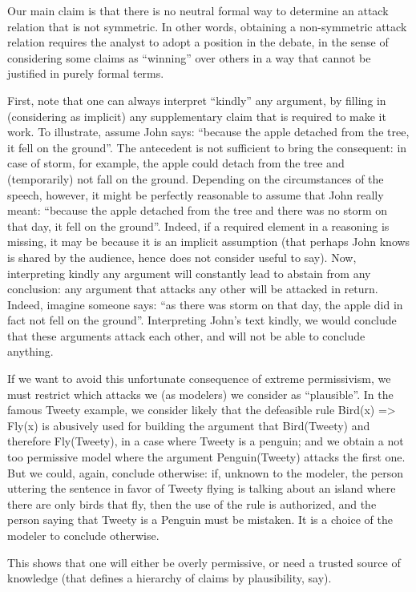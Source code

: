 \documentclass[version=3.21, pagesize, twoside=off, bibliography=totoc, DIV=calc, fontsize=12pt, a4paper, french, english]{scrartcl}
\begin{document}
Our main claim is that there is no neutral formal way to determine an attack relation that is not symmetric. In other words, obtaining a non-symmetric attack relation requires the analyst to adopt a position in the debate, in the sense of considering some claims as “winning” over others in a way that cannot be justified in purely formal terms.

First, note that one can always interpret “kindly” any argument, by filling in (considering as implicit) any supplementary claim that is required to make it work. To illustrate, assume John says: “because the apple detached from the tree, it fell on the ground”. The antecedent is not sufficient to bring the consequent: in case of storm, for example, the apple could detach from the tree and (temporarily) not fall on the ground. Depending on the circumstances of the speech, however, it might be perfectly reasonable to assume that John really meant: “because the apple detached from the tree and there was no storm on that day, it fell on the ground”. Indeed, if a required element in a reasoning is missing, it may be because it is an implicit assumption (that perhaps John knows is shared by the audience, hence does not consider useful to say). Now, interpreting kindly any argument will constantly lead to abstain from any conclusion: any argument that attacks any other will be attacked in return. Indeed, imagine someone says: “as there was storm on that day, the apple did in fact not fell on the ground”. Interpreting John’s text kindly, we would conclude that these arguments attack each other, and will not be able to conclude anything.

If we want to avoid this unfortunate consequence of extreme permissivism, we must restrict which attacks we (as modelers) we consider as “plausible”. In the famous Tweety example, we consider likely that the defeasible rule Bird(x) => Fly(x) is abusively used for building the argument that Bird(Tweety) and therefore Fly(Tweety), in a case where Tweety is a penguin; and we obtain a not too permissive model where the argument Penguin(Tweety) attacks the first one. But we could, again, conclude otherwise: if, unknown to the modeler, the person uttering the sentence in favor of Tweety flying is talking about an island where there are only birds that fly, then the use of the rule is authorized, and the person saying that Tweety is a Penguin must be mistaken. It is a choice of the modeler to conclude otherwise.

This shows that one will either be overly permissive, or need a trusted source of knowledge (that defines a hierarchy of claims by plausibility, say).
\end{document}
